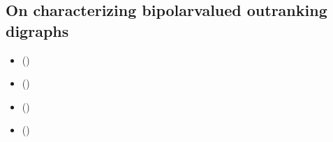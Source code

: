 \documentclass[a4paper,12pt,english]{sphinxhowto}
\begin{document}
\subsection{On characterizing bipolar\sphinxhyphen{}valued outranking digraphs}
\label{\detokenize{pearls:on-characterizing-bipolar-valued-outranking-digraphs}}\label{\detokenize{pearls:sufficiency-tutorial-label}}
\begin{sphinxcontents}
\begin{itemize}
\item {} 
\sphinxAtStartPar
{}\label{\detokenize{pearls:id165}}{\hyperref[\detokenize{pearls:necessary-properties-of-the-outranking-digraph}]{}} ()

\item {} 
\sphinxAtStartPar
{}\label{\detokenize{pearls:id166}}{\hyperref[\detokenize{pearls:partial-tournaments-may-be-strict-outranking-digraphs}]{}} ()

\item {} 
\sphinxAtStartPar
{}\label{\detokenize{pearls:id167}}{\hyperref[\detokenize{pearls:recognizing-bipolar-outranking-valuations}]{}} ()

\item {} 
\sphinxAtStartPar
{}\label{\detokenize{pearls:id168}}{\hyperref[\detokenize{pearls:on-generating-random-outranking-valuations}]{}} ()

\end{itemize}
\end{sphinxcontents}
\end{document}

